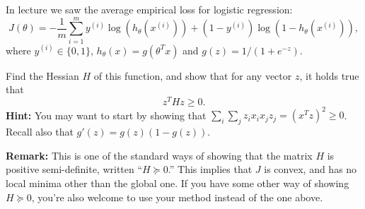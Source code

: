 \item {}
In lecture we saw the average empirical loss for logistic regression:
\begin{equation*}
	J(\theta)
	= -\frac{1}{m} \sum_{i=1}^m y^{(i)}\log(h_{\theta}(x^{(i)}))
		+  (1 - y^{(i)})\log(1 - h_{\theta}(x^{(i)})),
\end{equation*}
where $y^{(i)} \in \{0, 1\}$, $h_\theta(x) = g(\theta^T x)$ and
$g(z) = 1 / (1 + e^{-z})$.

Find the Hessian $H$ of this function, and show that for any vector $z$, it
holds true that
%
\begin{equation*}
    z^T H z \ge 0.
\end{equation*}
%
{\bf Hint:} You may want to start by showing that
$\sum_i\sum_j z_i x_i x_j z_j = (x^Tz)^2 \geq 0$. Recall also that
$g'(z) = g(z)(1-g(z))$.

{\bf Remark:} This is one of the standard ways of showing that the matrix $H$
is positive semi-definite, written ``$H \succeq 0$.''  This implies that $J$ is
convex, and has no local minima other than the global one. If you have some
other way of showing $H \succeq 0$, you're also welcome to use your method
instead of the one above.

\ifnum{} {
  
  
} \fi
